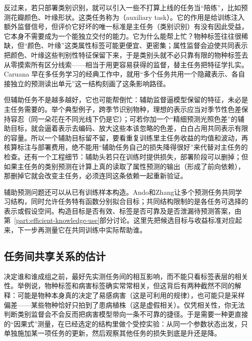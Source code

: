 反过来，若只部署类别识别，就可以引入一些不打算上线的任务当“陪练”，比如预测花瓣颜色、叶缘形状。这类任务称为（auxiliary task）。它的作用是给训练注入额外监督信号，但评价它好坏的唯一标准是主任务（类别识别）有没有因此受益，它本身不需要成为一个能独立交付的能力。它为什么能帮上忙？物种标签往往很稀缺，但“颜色、叶缘”这类属性标签可能更便宜、更密集；属性监督会迫使共同表示把颜色、叶缘这些判别性特征保留下来，于是类别头就不必只靠有限的物种标签去从零摸索所有区分线索——相当于用更容易获得的监督，替主任务把特征学扎实。Caruana 早在多任务学习的经典工作中，就用“多个任务共用一个隐藏表示、各自接独立的预测读出单元”这一结构刻画了这条影响路径。

但辅助任务不是越多越好，它也可能帮倒忙：辅助监督逼模型保留的特征，未必是主任务需要的。举个典型例子，跨季节识别物种，理想的表示应当对季节性色差保持容忍（同一朵花在不同光线下仍是它）；可若你加一个“精细预测光照色差”的辅助目标，就会逼着表示去编码、放大这些本该忽略的色差，白白占用共同表示有限的容量。所以一个辅助目标留不留，要看重复训练里主任务收益的均值和波动，再核算标注与部署费用，绝不能用“辅助任务自己的损失降得很好”来代替对主任务的检查。还有一个工程细节：辅助头若只在训练时提供损失，部署阶段可以删掉；但如果主任务的类别预测在计算上真的读取了属性预测的输出（形成了前向依赖），那删掉它就会改变主任务，必须连同这条依赖一起重新验证。

辅助预测问题还可以从已有训练样本构造。Ando和Zhang让多个预测任务共同学习结构，同时允许任务特有函数分别拟合目标；共同结构限制的是各任务可选择的表示或假设空间。构造目标是否有效、标签是否可靠及是否泄漏待预测答案，由第~\ref{part:efficient-knowledge-use}部分讨论。这里先把候选目标与收益标准对应起来，下一步再测量它在共同训练中实际帮助谁。

\subsection{任务间共享关系的估计}
\label{sec:ket-sharing-affinity}

决定谁和谁成组之前，最好先实测任务间的相互影响，而不能只看标签表层的相关性。举例说，物种标签和病害标签确实常常相关，但这背后有两种截然不同的解释：可能是物种本身真的决定了易感病害（这是可利用的规律），也可能只是采样偏差——某些物种恰好只拍到了患病植株（这是虚假相关）。仅凭相关性，你无法判断类别监督会不会反而把病害模型带向一条不可靠的捷径。于是需要一种更直接的“因果式”测量，在已经选定的结构里做个受控实验：从同一个参数状态出发，只单独施加某一项任务的更新，然后观察其他任务的损失到底是升还是降。

